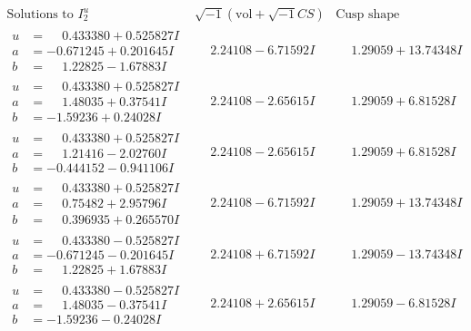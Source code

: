 \documentclass[1p]{elsarticle_modified}
\theoremstyle{definition}
\newcommand{\I}{\sqrt{-1}}
\begin{document}
$$\begin{array}{c|c|c}  
\text{Solutions to }I^u_{2}& \I (\text{vol} + \sqrt{-1}CS) & \text{Cusp shape}\\
 \hline 
\begin{aligned}
u &= \phantom{-}0.433380 + 0.525827 I \\
a &= -0.671245 + 0.201645 I \\
b &= \phantom{-}1.22825 - 1.67883 I\end{aligned}
 & \phantom{-}2.24108 - 6.71592 I & \phantom{-}1.29059 + 13.74348 I \\ \hline\begin{aligned}
u &= \phantom{-}0.433380 + 0.525827 I \\
a &= \phantom{-}1.48035 + 0.37541 I \\
b &= -1.59236 + 0.24028 I\end{aligned}
 & \phantom{-}2.24108 - 2.65615 I & \phantom{-}1.29059 + 6.81528 I \\ \hline\begin{aligned}
u &= \phantom{-}0.433380 + 0.525827 I \\
a &= \phantom{-}1.21416 - 2.02760 I \\
b &= -0.444152 - 0.941106 I\end{aligned}
 & \phantom{-}2.24108 - 2.65615 I & \phantom{-}1.29059 + 6.81528 I \\ \hline\begin{aligned}
u &= \phantom{-}0.433380 + 0.525827 I \\
a &= \phantom{-}0.75482 + 2.95796 I \\
b &= \phantom{-}0.396935 + 0.265570 I\end{aligned}
 & \phantom{-}2.24108 - 6.71592 I & \phantom{-}1.29059 + 13.74348 I \\ \hline\begin{aligned}
u &= \phantom{-}0.433380 - 0.525827 I \\
a &= -0.671245 - 0.201645 I \\
b &= \phantom{-}1.22825 + 1.67883 I\end{aligned}
 & \phantom{-}2.24108 + 6.71592 I & \phantom{-}1.29059 - 13.74348 I \\ \hline\begin{aligned}
u &= \phantom{-}0.433380 - 0.525827 I \\
a &= \phantom{-}1.48035 - 0.37541 I \\
b &= -1.59236 - 0.24028 I\end{aligned}
 & \phantom{-}2.24108 + 2.65615 I & \phantom{-}1.29059 - 6.81528 I \\ \hline\begin{aligned}

\end{aligned}
\end{array}$$
\end{document}
